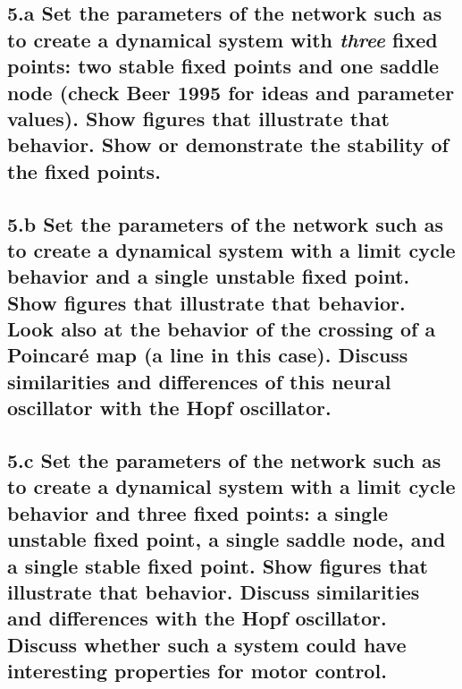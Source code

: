\documentclass{cmc}
\begin{document}
\subsection*{5.a Set the parameters of the network such as to create a dynamical
  system with \textit{three} fixed points: two stable fixed points and one
  saddle node (check Beer 1995 for ideas and parameter values). Show figures
  that illustrate that behavior. Show or demonstrate the stability of the fixed
  points.}


\subsection*{5.b Set the parameters of the network such as to create a dynamical
  system with a limit cycle behavior and a single unstable fixed point. Show
  figures that illustrate that behavior. Look also at the behavior of the
  crossing of a Poincaré map (a line in this case). Discuss similarities and
  differences of this neural oscillator with the Hopf oscillator.}


\subsection*{5.c Set the parameters of the network such as to create a dynamical
  system with a limit cycle behavior and three fixed points: a single unstable
  fixed point, a single saddle node, and a single stable fixed point. Show
  figures that illustrate that behavior. Discuss similarities and differences
  with the Hopf oscillator. Discuss whether such a system could have interesting
  properties for motor control.}
\end{document}
